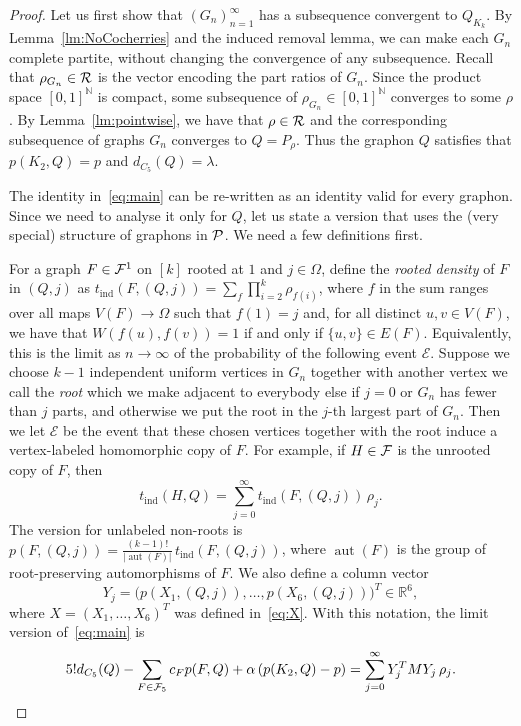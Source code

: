 \documentclass[12pt]{article}
\theoremstyle{definition}
\theoremstyle{remark}
\newcommand{\C}[1]{{\protect\mathcal{#1}}}
\newcommand{\tind}{t_{\mathrm{ind}}}
\newcommand{\aut}{\operatorname{aut}}
\newcommand{\I}[1]{{\mathbb #1}}
\begin{document}
\begin{proof} Let us first show that $(G_n)_{n=1}^\infty$ has a subsequence convergent to $Q_{K_k}$. By Lemma~\ref{lm:NoCocherries} and the induced removal lemma, we can make each $G_n$
complete partite, without changing the convergence of any subsequence. Recall that $\rho_{G_n}\in\C{R}$ is the vector encoding the part ratios of $G_n$. Since the product space $[0,1]^{\I N}$ is compact, some subsequence of $\rho_{G_n}\in[0,1]^{\I N}$ converges to some $\rho$. By Lemma~\ref{lm:pointwise}, we have that $\rho\in \C{R}$ and the corresponding subsequence of graphs $G_n$ converges to $Q=P_\rho$. Thus the graphon $Q$ satisfies that
$p(K_2,Q)=p$ and $d_{C_5}(Q)=\lambda$. 


The identity in~\eqref{eq:main} can be re-written as an identity valid for every graphon. Since we need to analyse it only for $Q$, let us state a version that uses the (very special) structure of graphons in $\C P$. We need a few definitions first.

For a graph $F\in\C F^1$ on $[k]$ rooted at $1$ and $j\in\Omega$, define the \emph{rooted density} of $F$ in $(Q,j)$ as $\tind(F,(Q,j))=\sum_f \prod_{i=2}^k \rho_{f(i)}$, where $f$ in the sum ranges over all maps $V(F)\to \Omega$ such that $f(1)=j$ and, for all distinct $u,v\in V(F)$, we have that $W(f(u),f(v))=1$ if and only if $\{u,v\}\in E(F)$. Equivalently, this is the limit as $n\to\infty$ of the probability of the following event $\mathcal{E}$. Suppose we choose $k-1$ independent uniform vertices in $G_n$ together with another vertex we call the {\em root} which we make adjacent to everybody else if $j=0$ or $G_n$ has fewer than $j$ parts, and otherwise we put the root in the $j$-th largest part of $G_n$. Then we let $\mathcal{E}$ be the event that these chosen vertices together with the root induce a vertex-labeled homomorphic copy of $F$. For example, if $H\in\C F$ is the unrooted copy of $F$, then 
 \begin{equation}\label{eq:AvOfTind}
 \tind(H,Q)=\sum_{j=0}^\infty \tind(F,(Q,j))\, \rho_j.
 \end{equation}
The version for unlabeled non-roots is $p(F,(Q,j))=\frac{(k-1)!}{|\aut(F)|}\, \tind(F,(Q,j))$, where $\aut(F)$ is the group of root-preserving automorphisms of $F$. We also define a column vector  
$$
Y_j=\big(p(X_1,(Q,j)),\dots,p(X_6,(Q,j))\big)^T\in\I R^6,
$$
 where $X=(X_1,\dots,X_6)^T$ was defined in~\eqref{eq:X}. With this notation, the limit version of~\eqref{eq:main} %
 is
\begin{equation}\label{eq:identity}
5! d_{C_5}(Q)-\sum_{F\in\C F_5} c_F p(F,Q)+\alpha\left(p(K_2,Q)-p\right)=\sum_{j=0}^\infty   Y_j^T MY_j\, \rho_j.
\end{equation}


\end{proof}
\end{document}
